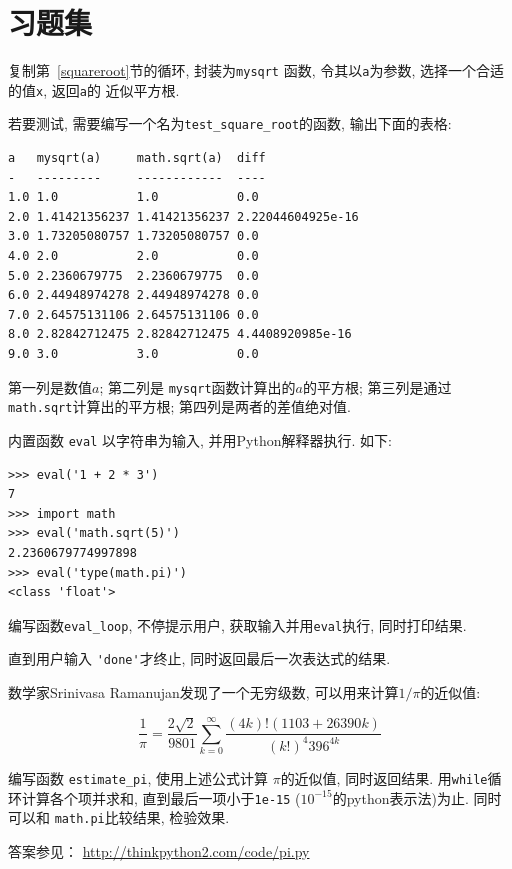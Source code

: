 \documentclass[10pt]{book}
\begin{document}
\section{习题集}

\begin{exercise}

复制第~\ref{squareroot}节的循环, 封装为\verb"mysqrt" 函数, 
令其以{\tt a}为参数, 选择一个合适的值{\tt x}, 返回{\tt a}的
近似平方根.  

若要测试, 需要编写一个名为\verb"test_square_root"的函数, 
输出下面的表格:

\begin{verbatim}
a   mysqrt(a)     math.sqrt(a)  diff
-   ---------     ------------  ----
1.0 1.0           1.0           0.0
2.0 1.41421356237 1.41421356237 2.22044604925e-16
3.0 1.73205080757 1.73205080757 0.0
4.0 2.0           2.0           0.0
5.0 2.2360679775  2.2360679775  0.0
6.0 2.44948974278 2.44948974278 0.0
7.0 2.64575131106 2.64575131106 0.0
8.0 2.82842712475 2.82842712475 4.4408920985e-16
9.0 3.0           3.0           0.0
\end{verbatim}
%
第一列是数值$a$; 第二列是 \verb"mysqrt"函数计算出的$a$的平方根;
第三列是通过{\tt math.sqrt}计算出的平方根;
第四列是两者的差值绝对值. 
\end{exercise}


\begin{exercise}
内置函数 {\tt eval} 以字符串为输入, 并用Python解释器执行. 
如下:

\begin{verbatim}
>>> eval('1 + 2 * 3')
7
>>> import math
>>> eval('math.sqrt(5)')
2.2360679774997898
>>> eval('type(math.pi)')
<class 'float'>
\end{verbatim}
%
编写函数\verb"eval_loop", 不停提示用户, 获取输入并用{\tt eval}执行, 
同时打印结果. 

直到用户输入 \verb"'done'"才终止, 
同时返回最后一次表达式的结果. 

\end{exercise}


\begin{exercise}
数学家Srinivasa Ramanujan发现了一个无穷级数, 
可以用来计算$1 / \pi$的近似值:

\[ \frac{1}{\pi} = \frac{2\sqrt{2}}{9801} 
\sum^\infty_{k=0} \frac{(4k)!(1103+26390k)}{(k!)^4 396^{4k}} \]

编写函数 \verb"estimate_pi", 使用上述公式计算 $\pi$的近似值, 
同时返回结果. 用{\tt while}循环计算各个项并求和, 直到最后一项小于{\tt 1e-15}
($10^{-15}$的python表示法)为止. 
同时可以和 {\tt math.pi}比较结果, 检验效果. 

答案参见： \url{http://thinkpython2.com/code/pi.py}

\end{exercise}
\end{document}
